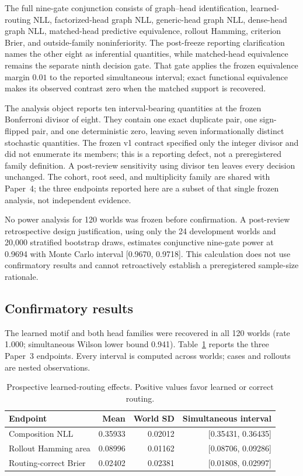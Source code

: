 The full nine-gate conjunction consists of graph--head identification,
learned-routing NLL, factorized-head graph NLL, generic-head graph NLL,
dense-head graph NLL, matched-head predictive equivalence, rollout Hamming,
criterion Brier, and outside-family noninferiority.  The post-freeze reporting
clarification names the other eight as inferential quantities, while
matched-head equivalence remains the separate ninth decision gate.  That gate
applies the frozen equivalence margin $0.01$ to the reported simultaneous interval;
exact functional equivalence makes its observed contrast zero when the matched
support is recovered.

The analysis object reports ten interval-bearing quantities at the frozen
Bonferroni divisor of eight.  They contain one exact duplicate pair, one
sign-flipped pair, and one deterministic zero, leaving seven informationally
distinct stochastic quantities.  The frozen v1 contract specified only the
integer divisor and did not enumerate its members; this is a reporting defect,
not a preregistered family definition.  A post-review sensitivity using divisor
ten leaves every decision unchanged.  The cohort, root seed, and multiplicity
family are shared with Paper~4; the three endpoints reported here are a subset
of that single frozen analysis, not independent evidence.

No power analysis for 120 worlds was frozen before confirmation.  A
post-review retrospective design justification, using only the 24 development
worlds and 20,000 stratified bootstrap draws, estimates conjunctive nine-gate
power at 0.9694 with Monte Carlo interval [0.9670, 0.9718].  This calculation
does not use confirmatory results and cannot retroactively establish a
preregistered sample-size rationale.

\subsection{Confirmatory results}

The learned motif and both head families were recovered in all 120 worlds
(rate 1.000; simultaneous Wilson lower bound 0.941).  Table~\ref{tab:resolution}
reports the three Paper~3 endpoints.  Every interval is computed across worlds;
cases and rollouts are nested observations.

\begin{table}[ht]
\centering
\caption{Prospective learned-routing effects.  Positive values favor learned
or correct routing.}
\label{tab:resolution}
\begin{tabular}{lrrr}
\toprule
Endpoint & Mean & World SD & Simultaneous interval \\
\midrule
Composition NLL & 0.35933 & 0.02012 & [0.35431, 0.36435] \\
Rollout Hamming area & 0.08996 & 0.01162 & [0.08706, 0.09286] \\
Routing-correct Brier & 0.02402 & 0.02381 & [0.01808, 0.02997] \\
\bottomrule
\end{tabular}
\end{table}

